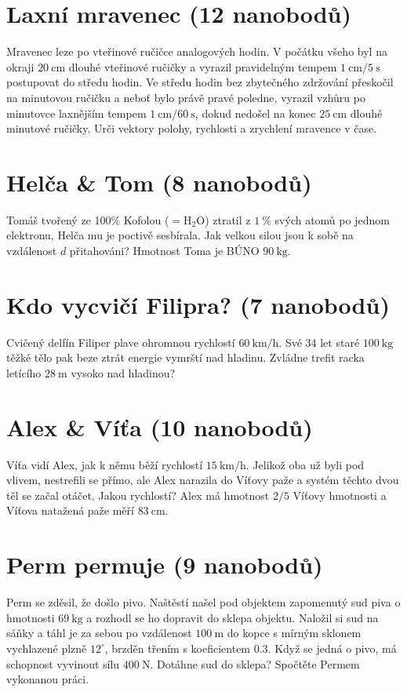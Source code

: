 \documentclass[10pt,a4paper,landscape]{article}
\begin{document}
\begin{multicols}{2}[]
\section{Laxní mravenec (12 nanobodů)}
Mravenec leze po vteřinové ručičce analogových hodin. V počátku všeho byl na okraji $20~\mathrm{cm}$ dlouhé vteřinové ručičky a vyrazil pravidelným tempem $1~\mathrm{cm}$/$5~\mathrm{s}$ postupovat do středu hodin. Ve středu hodin bez zbytečného zdržování přeskočil na minutovou ručičku a neboť bylo právě pravé poledne, vyrazil vzhůru po minutovce laxnějším tempem $1~\mathrm{cm}$/$60~\mathrm{s}$, dokud nedošel na konec $25~\mathrm{cm}$ dlouhé minutové ručičky. Urči vektory polohy, rychlosti a zrychlení mravence v čase.
\columnbreak

\section{Helča \& Tom (8 nanobodů)}
Tomáš tvořený ze 100\% Kofolou ($=\mathrm{H}_2\mathrm{O}$) ztratil z $1~\%$ svých atomů po jednom elektronu, Helča mu je poctivě sesbírala. Jak velkou silou jsou k sobě na vzdálenost $d$ přitahováni? Hmotnost Toma je BÚNO $90~\mathrm{kg}$. 


\section{Kdo vycvičí Filipra? (7 nanobodů)}
Cvičený delfín Filiper plave ohromnou rychlostí $60~\mathrm{km/h}$. Své 34 let staré $100~\mathrm{kg}$ těžké tělo pak beze ztrát energie vymrští nad hladinu. Zvládne trefit racka letícího $28~\mathrm{m}$ vysoko nad hladinou?

\section{Alex \& Víťa (10 nanobodů)}
Víťa vidí Alex, jak k němu běží rychlostí $15~\mathrm{km/h}$. Jelikož oba už byli pod vlivem, nestrefili se přímo, ale Alex narazila do Víťovy paže a systém těchto dvou těl se začal otáčet. Jakou rychlostí? Alex má hmotnost $2/5$ Víťovy hmotnosti a Víťova natažená paže měří $83~\mathrm{cm}$.

\section{Perm permuje (9 nanobodů)}
	Perm se zděsil, že došlo pivo. Naštěstí našel pod objektem zapomenutý sud piva o hmotnosti $69~\mathrm{kg}$ a rozhodl se ho dopravit do sklepa objektu. Naložil si sud na sáňky a táhl je za sebou po vzdálenost $100~\mathrm{m}$ do kopce s mírným sklonem vychlazené plzně $12^{\circ}$, brzděn třením s koeficientem $0.3$. Když se jedná o pivo, má schopnost vyvinout sílu $400~\mathrm{N}$. Dotáhne sud do sklepa? Spočtěte Permem vykonanou práci.


\end{multicols}
\end{document}
